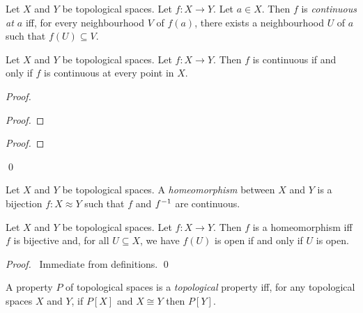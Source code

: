 \begin{df}
Let $X$ and $Y$ be topological spaces. Let $f : X \rightarrow Y$. Let $a \in X$. Then $f$ is \emph{continuous at $a$} iff, for every neighbourhood $V$ of $f(a)$, there exists a neighbourhood $U$ of $a$ such that $f(U) \subseteq V$.
\end{df}

\begin{prop}
Let $X$ and $Y$ be topological spaces. Let $f : X \rightarrow Y$. Then $f$ is continuous if and only if $f$ is continuous at every point in $X$.
\end{prop}

\begin{proof}
\begin{proof}
\end{proof}
\begin{proof}
\end{proof}
\qed
\end{proof}

\begin{df}[Homeomorphism]
Let $X$ and $Y$ be topological spaces. A \emph{homeomorphism} between $X$ and $Y$ is a bijection $f : X \approx Y$ such that $f$ and ${f}^{-1}$ are continuous.
\end{df}

\begin{prop}
Let $X$ and $Y$ be topological spaces. Let $f : X \rightarrow Y$. Then $f$ is a homeomorphism iff $f$ is bijective and, for all $U \subseteq X$, we have $f(U)$ is open if and only if $U$ is open.
\end{prop}

\begin{proof}
\pf\ Immediate from definitions. \qed
\end{proof}

\begin{df}
A property $P$ of topological spaces is a \emph{topological} property iff, for any topological spaces $X$ and $Y$, if $P[X]$ and $X \cong Y$ then $P[Y]$.
\end{df}


